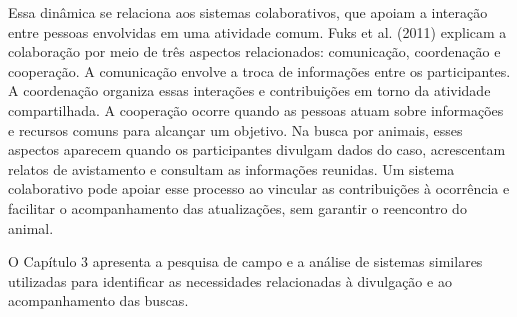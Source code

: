 Essa dinâmica se relaciona aos sistemas colaborativos, que apoiam a interação entre pessoas envolvidas em uma atividade comum. Fuks et al. (2011) explicam a colaboração por meio de três aspectos relacionados: comunicação, coordenação e cooperação. A comunicação envolve a troca de informações entre os participantes. A coordenação organiza essas interações e contribuições em torno da atividade compartilhada. A cooperação ocorre quando as pessoas atuam sobre informações e recursos comuns para alcançar um objetivo. Na busca por animais, esses aspectos aparecem quando os participantes divulgam dados do caso, acrescentam relatos de avistamento e consultam as informações reunidas. Um sistema colaborativo pode apoiar esse processo ao vincular as contribuições à ocorrência e facilitar o acompanhamento das atualizações, sem garantir o reencontro do animal.

O Capítulo 3 apresenta a pesquisa de campo e a análise de sistemas similares utilizadas para identificar as necessidades relacionadas à divulgação e ao acompanhamento das buscas.
